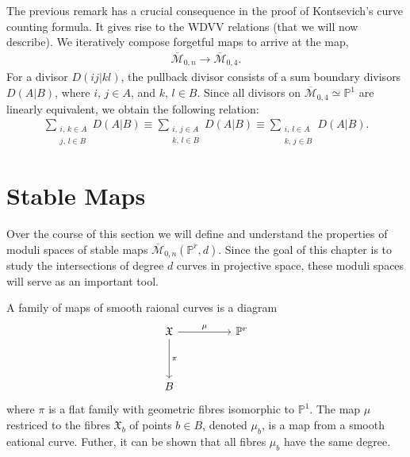 \begin{remark}
    The previous remark has a crucial consequence in the proof of Kontsevich's curve counting formula.
    It gives rise to the WDVV relations (that we will now describe).
    We iteratively compose forgetful maps to arrive at the map,
    \begin{align*}
        \overline{\mathcal{M}}_{0,n} \to \overline{\mathcal{M}}_{0,4}.
    \end{align*}
    For a divisor $D(ij|kl)$, the pullback divisor consists of a sum boundary divisors $D(A|B)$, where $i,\,j \in A$, and $k,\,l \in B$.
    Since all divisors on $\overline{\mathcal{M}}_{0,4} \simeq \mathbb{P}^{1}$ are linearly equivalent, we obtain the following relation:
    \begin{align*}
        \sum_{\substack{i,\,k \in A \\j,\,l \in B}} D(A|B) \equiv \sum_{\substack{i,\,j \in A \\k,\,l \in B}} D(A|B) \equiv \sum_{\substack{i,\,l \in A \\k,\,j \in B}} D(A|B).
    \end{align*}
\end{remark}

\section{Stable Maps}

Over the course of this section we will define and understand the properties of moduli spaces of stable maps $\overline{\mathcal{M}}_{0,n}(\mathbb{P}^{r},d)$.
Since the goal of this chapter is to study the intersections of degree $d$ curves in projective space, these moduli spaces will serve as an important tool.

\begin{definition}
    A family of maps of smooth raional curves is a diagram
    \[
        \begin{tikzcd}
            \mathfrak{X} & & \mathbb{P}^{r}\\
            \\
            B
            \arrow["\mu", from = 1-1, to = 1-3]
            \arrow["\pi", from = 1-1, to = 3-1]
        \end{tikzcd}
    \]
    where $\pi$ is a flat family with geometric fibres isomorphic to $\mathbb{P}^{1}$.
    The map $\mu$ restriced to the fibres $\mathfrak{X}_{b}$ of points $b \in B$, denoted $\mu_{b}$, is a map from a smooth eational curve. 
    Futher, it can be shown that all fibres $\mu_{b}$ have the same degree.
\end{definition}

